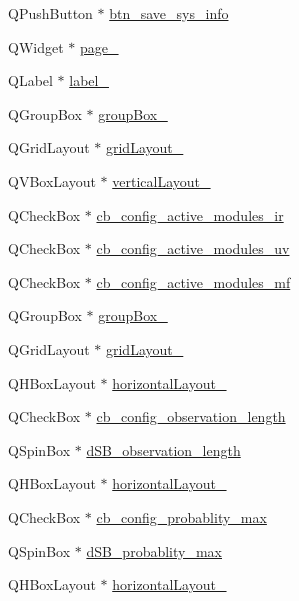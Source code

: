 \begin{DoxyCompactItemize}
Q\+Push\+Button $\ast$ \hyperlink{a00080_a5ccef61fb3372e70d59a662f4fde5db3}{btn\+\_\+save\+\_\+sys\+\_\+info}
\item 
Q\+Widget $\ast$ \hyperlink{a00080_a421261d29369be60b551aabe8b097597}{page\+\_}
\item 
Q\+Label $\ast$ \hyperlink{a00080_a13936e6f18b1c90402b3c7a3c92b6cdb}{label\+\_}
\item 
Q\+Group\+Box $\ast$ \hyperlink{a00080_a1a1fe5ec77ba52ba39a16db29ff0f91a}{group\+Box\+\_}
\item 
Q\+Grid\+Layout $\ast$ \hyperlink{a00080_ad113cf7b76aaf178473555bdf64ff035}{grid\+Layout\+\_}
\item 
Q\+V\+Box\+Layout $\ast$ \hyperlink{a00080_a7b66d5d6ab55f3977317359d09a42345}{vertical\+Layout\+\_}
\item 
Q\+Check\+Box $\ast$ \hyperlink{a00080_abef4ef3d5d03026de5d5e172eb0335a6}{cb\+\_\+config\+\_\+active\+\_\+modules\+\_\+ir}
\item 
Q\+Check\+Box $\ast$ \hyperlink{a00080_a72ad8a6b100948f9b1438cf3b949be5e}{cb\+\_\+config\+\_\+active\+\_\+modules\+\_\+uv}
\item 
Q\+Check\+Box $\ast$ \hyperlink{a00080_abc96d02b5b7a9480a2a142008e99a100}{cb\+\_\+config\+\_\+active\+\_\+modules\+\_\+mf}
\item 
Q\+Group\+Box $\ast$ \hyperlink{a00080_ab492988d340548c7f30e098419ef10ee}{group\+Box\+\_}
\item 
Q\+Grid\+Layout $\ast$ \hyperlink{a00080_a79b264e6945e3b94a511427b1c270dd7}{grid\+Layout\+\_}
\item 
Q\+H\+Box\+Layout $\ast$ \hyperlink{a00080_ad81454913b05646674b1a41c595b8510}{horizontal\+Layout\+\_}
\item 
Q\+Check\+Box $\ast$ \hyperlink{a00080_ae9e8f3f0d147a4cd21c8f36ffb3bd81f}{cb\+\_\+config\+\_\+observation\+\_\+length}
\item 
Q\+Spin\+Box $\ast$ \hyperlink{a00080_a1fe1bf902f2a365c4c94612d2a2ffbcc}{d\+S\+B\+\_\+observation\+\_\+length}
\item 
Q\+H\+Box\+Layout $\ast$ \hyperlink{a00080_a3b24c4bb360d79ae2e886fe63c8fdac7}{horizontal\+Layout\+\_}
\item 
Q\+Check\+Box $\ast$ \hyperlink{a00080_ad0a7ea02564c112595f0d30efa75eef2}{cb\+\_\+config\+\_\+probablity\+\_\+max}
\item 
Q\+Spin\+Box $\ast$ \hyperlink{a00080_a137b79e810736643ac4b15e221909871}{d\+S\+B\+\_\+probablity\+\_\+max}
\item 
Q\+H\+Box\+Layout $\ast$ \hyperlink{a00080_aa53955f35b7d9f3d161525ed8639db84}{horizontal\+Layout\+\_}

\end{DoxyCompactItemize}
